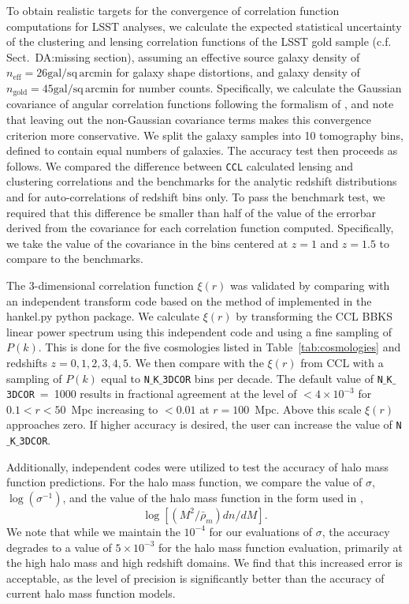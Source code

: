 \documentclass[\docopts]{\docclass}
\newcommand{\damonge}[1]{\textcolor{green!55!blue}{DA:#1}}
\newcommand{\ccl}{{\tt CCL}\xspace}
\begin{document}
To obtain realistic targets for the convergence of correlation function computations for LSST analyses, we calculate the expected statistical uncertainty of the clustering and lensing correlation functions of the LSST gold sample (c.f. Sect.~\damonge{missing section}),%
assuming an effective source galaxy density of $n_\mathrm{eff} = 26\mathrm{gal/sq\,arcmin}$ for galaxy shape distortions, and galaxy density of $n_\mathrm{gold} = 45\mathrm{gal/sq\,arcmin}$ for number counts. Specifically, we calculate the Gaussian covariance of angular correlation functions following the formalism of \citet{2008A&A...477...43J}, and note that leaving out the non-Gaussian covariance terms makes this convergence criterion more conservative. We split the galaxy samples into 10 tomography bins, defined to contain equal numbers of galaxies. The accuracy test then proceeds as follows. We compared the difference between \ccl calculated lensing and clustering correlations and the benchmarks for the analytic redshift distributions and for auto-correlations of redshift bins only. To pass the benchmark test, we required that this difference be smaller than half of the value of the errorbar derived from the covariance for each correlation function computed. Specifically, we take the value of the covariance in the bins centered at $z=1$ and $z=1.5$ to compare to the benchmarks.


The 3-dimensional correlation function $\xi(r)$ was validated by comparing with an independent transform code based
on the method of \cite{Ogata2005} implemented in the hankel.py python package. We calculate $\xi(r)$ by transforming the CCL
BBKS linear power spectrum using this independent code and using a fine sampling of $P(k)$. This is done for the five cosmologies
listed in Table~\ref{tab:cosmologies} and redshifts $z = 0,1,2,3,4,5$.  We then compare with the $\xi(r)$ from CCL with a sampling of $P(k)$
equal to {\tt N$\_$K$\_$3DCOR} bins per decade. The default value of {\tt N$\_$K$\_$3DCOR}~=~1000 results in fractional agreement
at the level of $<4 \times 10^{-3}$ for $0.1 < r < 50$~Mpc increasing to  $< 0.01 $ at $r = 100$~Mpc. Above this scale $\xi(r)$
approaches zero. If higher accuracy is desired, the user can increase the value of {\tt N$\_$K$\_$3DCOR}.


Additionally, independent codes were utilized to test the accuracy of halo mass function predictions. For the halo mass function, we compare the value of $\sigma$, $\log(\sigma^{-1})$, and the value of the halo mass function in the form used in \cite{Tinker2008},
\begin{equation}
\log[(M^2/\bar{\rho}_m)dn/dM].
\end{equation}
We note that while we maintain the $10^{-4}$ for our evaluations of $\sigma$, the accuracy degrades to a value of $5\times10^{-3}$ for the halo mass function evaluation, primarily at the high halo mass and high redshift domains. We find that this increased error is acceptable, as the level of precision is significantly better than the accuracy of current halo mass function models.
\end{document}
